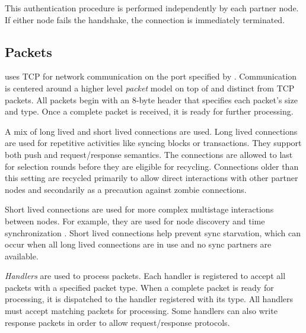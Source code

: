 This authentication procedure is performed independently by each partner node.
If either node fails the handshake, the connection is immediately terminated.

\subsection{Packets}

\codenamespace uses TCP for network communication on the port specified by .
Communication is centered around a higher level \emph{packet} model on top of and distinct from TCP packets.
All packets begin with an 8-byte header that specifies each packet's size and type.
Once a complete packet is received, it is ready for further processing.

\begin{figure}[H]
\end{figure}

A mix of long lived and short lived connections are used.
Long lived connections are used for repetitive activities like syncing blocks or transactions.
They support both push and request/response semantics.
The connections are allowed to last for  selection rounds  before they are eligible for recycling.
Connections older than this setting are recycled primarily to allow direct interactions with other partner nodes and secondarily as a precaution against zombie connections.

Short lived connections are used for more complex multistage interactions between nodes.
For example, they are used for node discovery  and time synchronization .
Short lived connections help prevent sync starvation, which can occur when all long lived connections are in use and no sync partners are available.

\emph{Handlers} are used to process packets.
Each handler is registered to accept all packets with a specified packet type.
When a complete packet is ready for processing, it is dispatched to the handler registered with its type.
All handlers must accept matching packets for processing.
Some handlers can also write response packets in order to allow request/response protocols.

